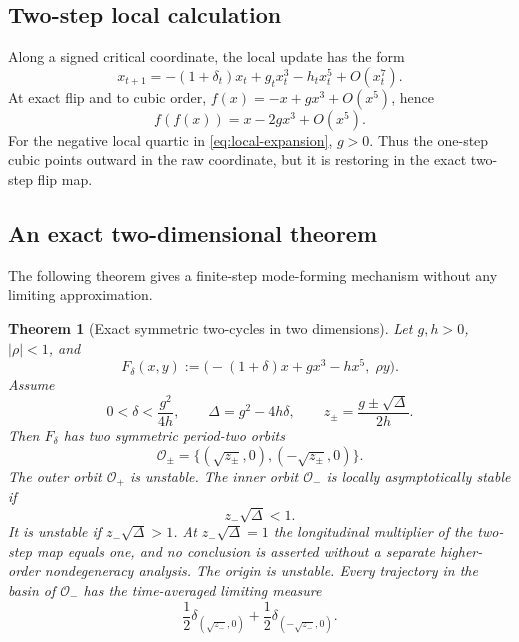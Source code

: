 \documentclass[11pt]{article}
\newtheorem{theorem}{Theorem}
\theoremstyle{definition}
\begin{document}
\subsection{Two-step local calculation}

Along a signed critical coordinate, the local update has the form
\begin{equation}
  x_{t+1}=-(1+\delta_t)x_t+g_tx_t^3-h_tx_t^5+O(x_t^7).
  \label{eq:local-flip}
\end{equation}
At exact flip and to cubic order,
$f(x)=-x+gx^3+O(x^5)$, hence
\begin{equation}
  f(f(x))=x-2gx^3+O(x^5).
  \label{eq:two-step-expansion}
\end{equation}
For the negative local quartic in \eqref{eq:local-expansion}, $g>0$.
Thus the one-step cubic points outward in the raw coordinate, but it is
restoring in the exact two-step flip map.

\subsection{An exact two-dimensional theorem}

The following theorem gives a finite-step mode-forming mechanism without any
limiting approximation.

\begin{theorem}[Exact symmetric two-cycles in two dimensions]
\label{thm:exact-2d-flip}
Let $g,h>0$, $|\rho|<1$, and
\begin{equation}
  F_\delta(x,y)
  :=\bigl(-(1+\delta)x+gx^3-hx^5,\;\rho y\bigr).
  \label{eq:2d-map}
\end{equation}
Assume
\begin{equation}
  0<\delta<\frac{g^2}{4h},
  \qquad
  \Delta=g^2-4h\delta,
  \qquad
  z_\pm=\frac{g\pm\sqrt\Delta}{2h}.
  \label{eq:cycle-roots}
\end{equation}
Then $F_\delta$ has two symmetric period-two orbits
\begin{equation}
  \mathcal O_\pm
  =\{(\sqrt{z_\pm},0),(-\sqrt{z_\pm},0)\}.
  \label{eq:two-cycles}
\end{equation}
The outer orbit $\mathcal O_+$ is unstable.  The inner orbit
$\mathcal O_-$ is locally asymptotically stable if
\begin{equation}
  z_-\sqrt\Delta<1.
  \label{eq:cycle-stability}
\end{equation}
It is unstable if $z_-\sqrt\Delta>1$.  At
$z_-\sqrt\Delta=1$ the longitudinal multiplier of the two-step map equals
one, and no conclusion is asserted without a separate higher-order
nondegeneracy analysis.
The origin is unstable.  Every trajectory in the basin of
$\mathcal O_-$ has the time-averaged limiting measure
\begin{equation}
  \frac12\delta_{(\sqrt{z_-},0)}
  +\frac12\delta_{(-\sqrt{z_-},0)}.
  \label{eq:cycle-measure}
\end{equation}
\end{theorem}
\end{document}
